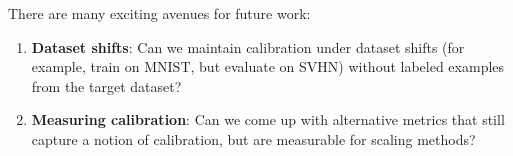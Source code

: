 There are many exciting avenues for future work:
\begin{enumerate}
\item \textbf{Dataset shifts}: Can we maintain calibration under dataset shifts (for example, train on MNIST, but evaluate on SVHN) without labeled examples from the target dataset?
\item \textbf{Measuring calibration}: Can we come up with alternative metrics that still capture a notion of calibration, but are measurable for scaling methods?

\end{enumerate}

